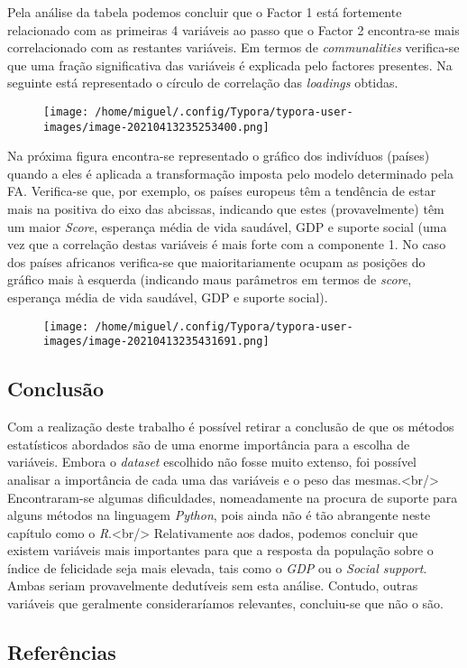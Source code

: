 \documentclass[]{article}
\begin{document}
Pela análise da tabela podemos concluir que o Factor 1 está fortemente
relacionado com as primeiras 4 variáveis ao passo que o Factor 2
encontra-se mais correlacionado com as restantes variáveis. Em termos de
\emph{communalities} verifica-se que uma fração significativa das
variáveis é explicada pelo factores presentes. Na seguinte está
representado o círculo de correlação das \emph{loadings} obtidas.

\begin{figure}
\centering
\texttt{[image: /home/miguel/.config/Typora/typora-user-images/image-20210413235253400.png]}
\caption{}
\end{figure}

Na próxima figura encontra-se representado o gráfico dos indivíduos
(países) quando a eles é aplicada a transformação imposta pelo modelo
determinado pela FA. Verifica-se que, por exemplo, os países europeus
têm a tendência de estar mais na positiva do eixo das abcissas,
indicando que estes (provavelmente) têm um maior \emph{Score}, esperança
média de vida saudável, GDP e suporte social (uma vez que a correlação
destas variáveis é mais forte com a componente 1. No caso dos países
africanos verifica-se que maioritariamente ocupam as posições do gráfico
mais à esquerda (indicando maus parâmetros em termos de \emph{score},
esperança média de vida saudável, GDP e suporte social).

\begin{figure}
\centering
\texttt{[image: /home/miguel/.config/Typora/typora-user-images/image-20210413235431691.png]}
\caption{}
\end{figure}

\hypertarget{header-n310}{%
\subsection{Conclusão}\label{header-n310}}

Com a realização deste trabalho é possível retirar a conclusão de que os
métodos estatísticos abordados são de uma enorme importância para a
escolha de variáveis. Embora o \emph{dataset} escolhido não fosse muito
extenso, foi possível analisar a importância de cada uma das variáveis e
o peso das mesmas.\textless{}br/\textgreater{} Encontraram-se algumas
dificuldades, nomeadamente na procura de suporte para alguns métodos na
linguagem \emph{Python}, pois ainda não é tão abrangente neste capítulo
como o \emph{R}.\textless{}br/\textgreater{} Relativamente aos dados,
podemos concluir que existem variáveis mais importantes para que a
resposta da população sobre o índice de felicidade seja mais elevada,
tais como o \emph{GDP} ou o \emph{Social support}. Ambas seriam
provavelmente dedutíveis sem esta análise. Contudo, outras variáveis que
geralmente consideraríamos relevantes, concluiu-se que não o são.

\hypertarget{header-n312}{%
\subsection{Referências}\label{header-n312}}
\end{document}
